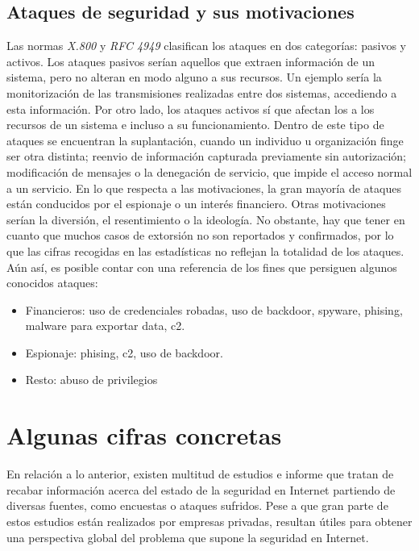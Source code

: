 \subsection{Ataques de seguridad y sus motivaciones}
Las normas \textit{X.800} y \textit {RFC 4949} clasifican los ataques en dos categorías: pasivos y activos. Los ataques pasivos serían aquellos que extraen información de un sistema, pero no alteran en modo alguno a sus recursos. Un ejemplo sería la monitorización de las transmisiones realizadas entre dos sistemas, accediendo a esta información. Por otro lado, los ataques activos sí que afectan los a los recursos de un sistema e incluso a su funcionamiento. Dentro de este tipo de ataques se encuentran la suplantación, cuando un individuo u organización finge ser otra distinta; reenvio de información capturada previamente sin autorización; modificación de mensajes o la denegación de servicio, que impide el acceso normal a un servicio\cite{Stallings2016}.
En lo que respecta a las motivaciones, la gran mayoría de ataques están conducidos por el espionaje o un interés financiero. Otras motivaciones serían la diversión, el resentimiento o la ideología. No obstante, hay que tener en cuanto que muchos casos de extorsión no son reportados y confirmados, por lo que las cifras recogidas en las estadísticas no reflejan la totalidad de los ataques. Aún así, es posible contar con una referencia de los fines que persiguen algunos conocidos ataques\cite{DBIR2017}: 
\begin{itemize}
	\item Financieros: uso de credenciales robadas, uso de backdoor, spyware, phising, malware para exportar data, c2.
	\item Espionaje: phising, c2, uso de backdoor.
	\item Resto: abuso de privilegios
\end{itemize}


\section{Algunas cifras concretas}
En relación a lo anterior, existen multitud de estudios e informe que tratan de recabar información acerca del estado de la seguridad en Internet partiendo de diversas fuentes, como encuestas o ataques sufridos. Pese a que gran parte de estos estudios están realizados por empresas privadas, resultan útiles para obtener una perspectiva global del problema que supone la seguridad en Internet.


